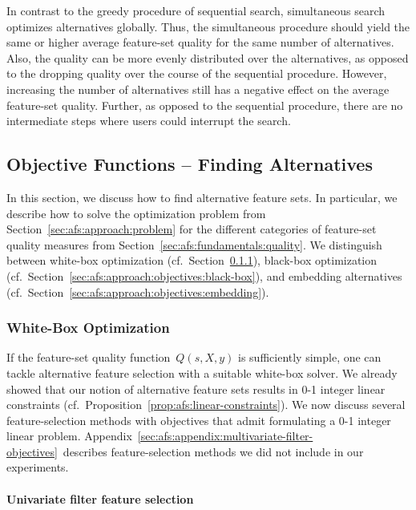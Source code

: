 \documentclass{article}
\theoremstyle{definition}
\begin{document}
In contrast to the greedy procedure of sequential search, simultaneous search optimizes alternatives globally.
Thus, the simultaneous procedure should yield the same or higher average feature-set quality for the same number of alternatives.
Also, the quality can be more evenly distributed over the alternatives, as opposed to the dropping quality over the course of the sequential procedure.
However, increasing the number of alternatives still has a negative effect on the average feature-set quality.
Further, as opposed to the sequential procedure, there are no intermediate steps where users could interrupt the search.

\subsection{Objective Functions -- Finding Alternatives}
\label{sec:afs:approach:objectives}

In this section, we discuss how to find alternative feature sets.
In particular, we describe how to solve the optimization problem from Section~\ref{sec:afs:approach:problem} for the different categories of feature-set quality measures from Section~\ref{sec:afs:fundamentals:quality}.
We distinguish between white-box optimization (cf.~Section~\ref{sec:afs:approach:objectives:white-box}), black-box optimization (cf.~Section~\ref{sec:afs:approach:objectives:black-box}), and embedding alternatives (cf.~Section~\ref{sec:afs:approach:objectives:embedding}).

\subsubsection{White-Box Optimization}
\label{sec:afs:approach:objectives:white-box}

If the feature-set quality function~$Q(s,X,y)$ is sufficiently simple, one can tackle alternative feature selection with a suitable white-box solver.
We already showed that our notion of alternative feature sets results in 0-1 integer linear constraints (cf.~Proposition~\ref{prop:afs:linear-constraints}).
We now discuss several feature-selection methods with objectives that admit formulating a 0-1 integer linear problem.
Appendix~\ref{sec:afs:appendix:multivariate-filter-objectives}~describes feature-selection methods we did not include in our experiments.

\paragraph{Univariate filter feature selection}
\end{document}
